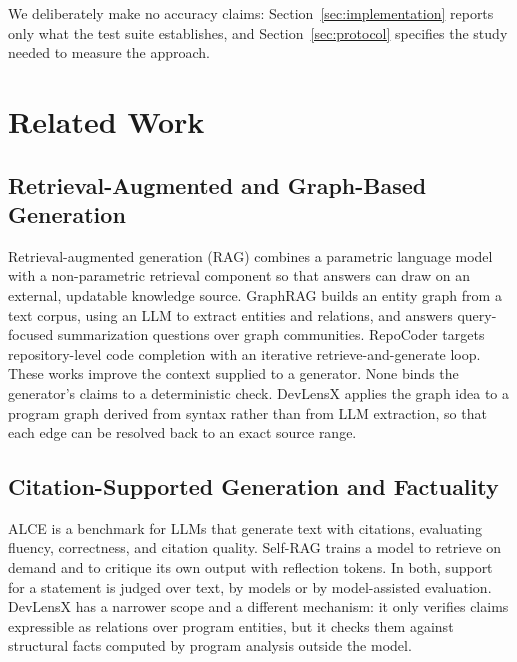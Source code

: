 \documentclass[runningheads]{llncs}
\begin{document}
We deliberately make no accuracy claims: Section~\ref{sec:implementation} reports only what the test suite establishes, and Section~\ref{sec:protocol} specifies the study needed to measure the approach.

\section{Related Work}

\subsection{Retrieval-Augmented and Graph-Based Generation}
Retrieval-augmented generation (RAG) \cite{lewis2020rag} combines a parametric language model with a non-parametric retrieval component so that answers can draw on an external, updatable knowledge source. GraphRAG \cite{edge2024graphrag} builds an entity graph from a text corpus, using an LLM to extract entities and relations, and answers query-focused summarization questions over graph communities. RepoCoder \cite{zhang2023repocoder} targets repository-level code completion with an iterative retrieve-and-generate loop. These works improve the context supplied to a generator. None binds the generator's claims to a deterministic check. DevLensX applies the graph idea to a program graph derived from syntax rather than from LLM extraction, so that each edge can be resolved back to an exact source range.

\subsection{Citation-Supported Generation and Factuality}
ALCE \cite{gao2023alce} is a benchmark for LLMs that generate text with citations, evaluating fluency, correctness, and citation quality. Self-RAG \cite{asai2024selfrag} trains a model to retrieve on demand and to critique its own output with reflection tokens. In both, support for a statement is judged over text, by models or by model-assisted evaluation. DevLensX has a narrower scope and a different mechanism: it only verifies claims expressible as relations over program entities, but it checks them against structural facts computed by program analysis outside the model.
\end{document}
